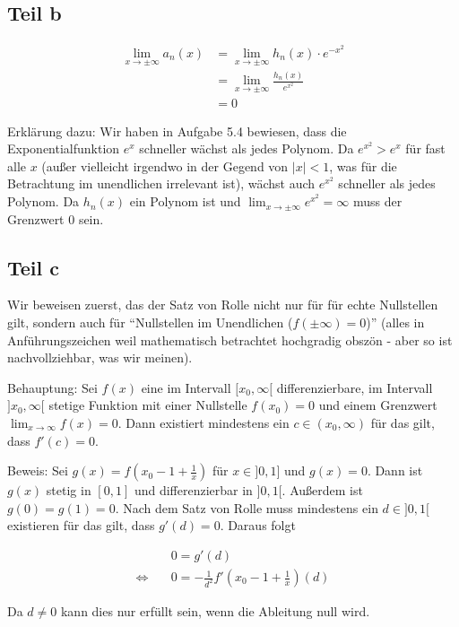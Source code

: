 \documentclass[a4paper,german,12pt,smallheadings]{scrartcl}
\begin{document}
\subsection*{Teil b}

\begin{align*}
  \lim_{x \to \pm \infty} a_n(x) &= \lim_{x \to \pm \infty} h_n(x) \cdot e^{-x^2} \\
  &= \lim_{x \to \pm \infty} \frac{h_n(x)}{e^{x^2}} \\
  &= 0
\end{align*}

Erklärung dazu: Wir haben in Aufgabe 5.4 bewiesen, dass die Exponentialfunktion
$e^x$ schneller wächst als jedes Polynom. Da $e^{x^2} > e^x$ für fast alle $x$
(außer vielleicht irgendwo in der Gegend von $|x| < 1$, was für die Betrachtung
im unendlichen irrelevant ist), wächst auch $e^{x^2}$ schneller als jedes
Polynom. Da $h_n(x)$ ein Polynom ist und $\lim_{x \to \pm \infty} e^{x^2} =
\infty$ muss der Grenzwert 0 sein.

\subsection*{Teil c}

Wir beweisen zuerst, das der Satz von Rolle nicht nur für für echte Nullstellen
gilt, sondern auch für ``Nullstellen im Unendlichen ($f(\pm\infty) = 0$)'' (alles
in Anführungszeichen weil mathematisch betrachtet hochgradig obszön - aber so
ist nachvollziehbar, was wir meinen).

Behauptung: Sei $f(x)$ eine im Intervall $[x_0, \infty[$ differenzierbare, im
Intervall $]x_0, \infty[$ stetige Funktion mit einer Nullstelle $f(x_0) = 0$
und einem Grenzwert $\lim_{x \to \infty} f(x) = 0$. Dann existiert mindestens
ein $c \in (x_0, \infty)$ für das gilt, dass $f'(c) = 0$.

Beweis: Sei $g(x) = f\left(x_0 - 1 + \frac{1}{x}\right)$ für $x \in ]0, 1]$ und $g(x) =
0$. Dann ist $g(x)$ stetig in $[0,1]$ und differenzierbar in $]0, 1[$. Außerdem
ist $g(0) = g(1) = 0$. Nach dem Satz von Rolle muss mindestens ein $d \in ]0,1[$
existieren für das gilt, dass $g'(d) = 0$. Daraus folgt 

\begin{align*}
  &0 = g'(d) \\
  \Leftrightarrow\quad&0 = -\frac{1}{d^2} f'\left(x_0 - 1 + \frac{1}{x}\right)(d)
\end{align*}

Da $d \neq 0$ kann dies nur erfüllt sein, wenn die Ableitung null wird.
\end{document}
